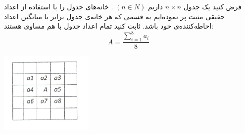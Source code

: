 \EXERCISE
فرض کنید یک جدول
$n \times n$
داریم
$(n \in N)$
. خانه‌های جدول را با استفاده از اعداد حقیقی مثبت پر نموده‌ایم به قسمی که هر خانه‌ی جدول برابر با میانگین اعداد احاطه‌کننده‌ی خود باشد. ثابت کنید تمام اعداد جدول با هم مساوی هستند:
$$A = \frac{\sum_{i=1}^{8} a_i}{8}$$
\begin{center}
\includegraphics[height=4cm]{12.png}
\end{center}
